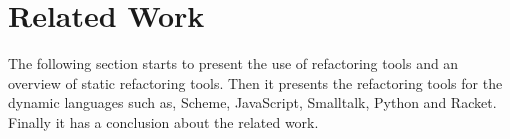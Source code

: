 
% 
% 

\section{Related Work}

The following section starts to present the use of refactoring tools and an overview of static refactoring tools. 
Then it presents the refactoring tools for the dynamic languages such as, Scheme, JavaScript, Smalltalk, Python and Racket.
Finally it has a conclusion about the related work. %


\clearpage

%
 













